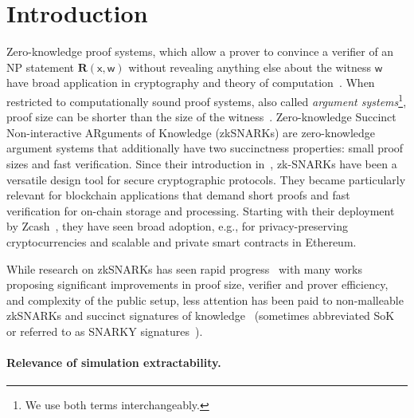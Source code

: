 \documentclass[10pt]{llncs}
\newcommand{\pcvarstyle}[1]{\mathsf{#1}}
\newcommand{\REL}{\mathbf{R}}
\newcommand{\inp}{\pcvarstyle{x}}
\newcommand{\wit}{\pcvarstyle{w}}
\begin{document}
\section{Introduction}
Zero-knowledge proof systems, which allow a prover to convince a verifier of an NP statement $\REL(\inp,\wit)$ without revealing anything else about the witness $\wit$ have broad application in cryptography and theory of computation~\cite{FOCS:GolMicWig86,STOC:Fortnow87,C:BGGHKMR88}.
When restricted to computationally sound proof systems, also called \emph{argument systems}\footnote{We use both terms interchangeably.}, proof size can be shorter than the size of the witness~\cite{brassard1988minimum}. 
Zero-knowledge Succinct Non-interactive ARguments of Knowledge (zkSNARKs) are zero-knowledge argument systems that additionally have two succinctness properties: small proof sizes and fast verification. 
Since their introduction in~\cite{FOCS:Micali94}, zk-SNARKs have been a versatile design tool for secure cryptographic protocols. They became particularly relevant for blockchain applications that demand short proofs and fast verification for on-chain storage and processing. Starting with their deployment by Zcash~\cite{SP:BCGGMT14}, they have seen broad adoption, e.g., for privacy-preserving cryptocurrencies and scalable and private smart contracts in Ethereum.%


While research on zkSNARKs has seen rapid
progress~\cite{EC:GGPR13,AC:Groth10a,TCC:Lipmaa12,TCC:BCIOP13,SP:PHGR13,C:BCGTV13,AC:Lipmaa13,USENIX:BCTV14,EC:Groth16}
with many works proposing significant improvements in proof size, verifier and prover efficiency, and complexity of the public setup,
less attention has been paid to non-malleable zkSNARKs and succinct signatures of
knowledge~\cite{C:CamSta97,C:ChaLys06} (sometimes abbreviated SoK or referred to as SNARKY signatures~\cite{C:GroMal17,EPRINT:BKSV20}). 


\paragraph{Relevance of simulation extractability.}
\end{document}
